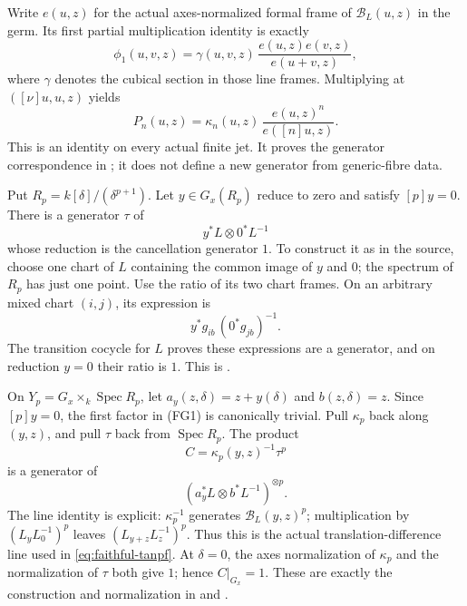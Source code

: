 Write \(e(u,z)\) for the actual axes-normalized formal
frame of \(\mathcal B_L(u,z)\) in the germ.
Its first partial multiplication identity is exactly
\[
 \phi_1(u,v,z)
  =\gamma(u,v,z)\,
             \frac{e(u,z)e(v,z)}{e(u+v,z)},
\]
where \(\gamma\) denotes the cubical section in those
line frames.
Multiplying at \(([\nu]u,u,z)\) yields
\[
              P_n(u,z)
                 =\kappa_n(u,z)\,
                               \frac{e(u,z)^n}{e([n]u,z)}.
 \tag{FG2}\label{eq:faithful-kappa-frame}
\]
This is an identity on every actual finite jet.
It proves the generator correspondence in
; it does not define a new
generator from generic-fibre data.

Put \(R_p=k[\delta]/(\delta^{p+1})\).
Let \(y\in G_x(R_p)\) reduce to zero and satisfy \([p]y=0\).
There is a generator \(\tau\) of
\[
                              y^*L\otimes0^*L^{-1}
 \tag{FG3}\label{eq:faithful-tau-line}
\]
whose reduction is the cancellation generator \(1\).
To construct it as in the source, choose one chart of \(L\)
containing the common image of \(y\) and \(0\); the spectrum
of \(R_p\) has just one point.
Use the ratio of its two chart frames.
On an arbitrary mixed chart \((i,j)\), its expression is
\[
                       y^*g_{i b}\,(0^*g_{j b})^{-1}.
\]
The transition cocycle for \(L\) proves these expressions
are a generator, and on reduction \(y=0\) their ratio is \(1\).
This is .

On \(Y_p=G_x\times_k\operatorname{Spec}R_p\), let
\(a_y(z,\delta)=z+y(\delta)\) and \(b(z,\delta)=z\).
Since \([p]y=0\), the first factor in (FG1) is canonically
trivial.
Pull \(\kappa_p\) back along \((y,z)\), and pull \(\tau\)
back from \(\operatorname{Spec}R_p\).
The product
\[
                             C=\kappa_p(y,z)^{-1}\tau^p
 \tag{FG4}\label{eq:faithful-C-generator}
\]
is a generator of
\[
                   (a_y^*L\otimes b^*L^{-1})^{\otimes p}.
\]
The line identity is explicit:
\(\kappa_p^{-1}\) generates \(\mathcal B_L(y,z)^p\);
multiplication by \((L_yL_0^{-1})^p\) leaves
\((L_{y+z}L_z^{-1})^p\).
Thus this is the actual translation-difference line used
in \eqref{eq:faithful-tanpf}.
At \(\delta=0\), the axes normalization of \(\kappa_p\)
and the normalization of \(\tau\) both give \(1\);
hence \(C|_{G_x}=1\).
These are exactly the construction and normalization in
and .

